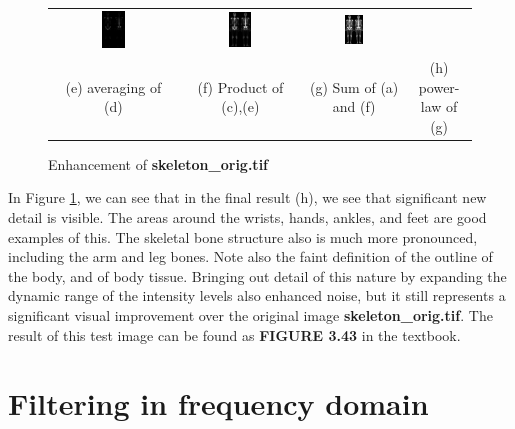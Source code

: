 \documentclass[11pt,a4paper]{article}
\begin{document}
\begin{figure}[!htbp]
\begin{tabular}{cccc}
		\includegraphics[width=0.2\textwidth]{pro2/f}&
		\includegraphics[width=0.2\textwidth]{pro2/g}&
		\includegraphics[width=0.2\textwidth]{pro2/h} \\
		(e) averaging of (d) & (f) Product of (c),(e) & (g) Sum of (a) and (f)
		& (h) power-law of (g)
	\end{tabular}
	\caption{Enhancement of \textbf{skeleton\_orig.tif}}
	\label{pro2_fig1}
\end{figure}

In Figure \ref{pro2_fig1}, we can see that in the final result (h), we see that significant new
detail is visible. The areas around the wrists, hands, ankles, and
feet are good examples of this. The skeletal bone structure also is much more
pronounced, including the arm and leg bones. Note also the faint definition of
the outline of the body, and of body tissue. Bringing out detail of this nature by
expanding the dynamic range of the intensity levels also enhanced noise, but it still 
represents a significant visual improvement over the original image \textbf{skeleton\_orig.tif}.
The result of this test image can be found as \textbf{FIGURE 3.43} in the textbook.

\section{Filtering in frequency domain}
\end{document}
